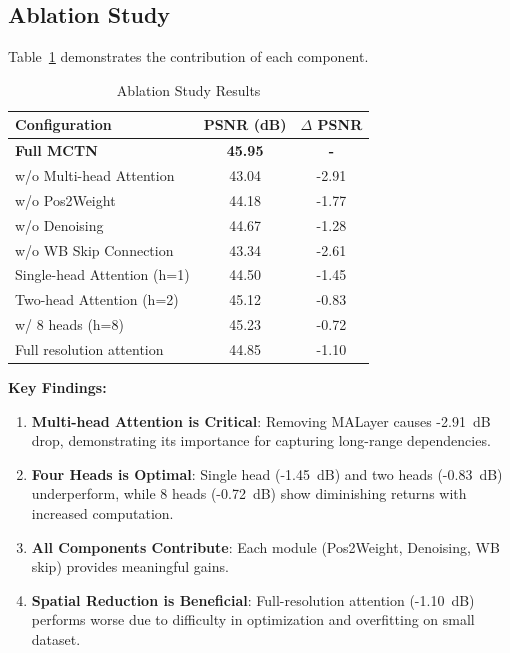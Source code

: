 \documentclass[conference]{IEEEtran}
\begin{document}
\subsection{Ablation Study}

Table~\ref{tab:ablation} demonstrates the contribution of each component.

\begin{table}[h]
\centering
\caption{Ablation Study Results}
\label{tab:ablation}
\begin{tabular}{lcc}
\toprule
\textbf{Configuration} & \textbf{PSNR (dB)} & \textbf{$\Delta$ PSNR} \\
\midrule
\textbf{Full MCTN} & \textbf{45.95} & \textbf{-} \\
\midrule
w/o Multi-head Attention & 43.04 & -2.91 \\
w/o Pos2Weight & 44.18 & -1.77 \\
w/o Denoising & 44.67 & -1.28 \\
w/o WB Skip Connection & 43.34 & -2.61 \\
Single-head Attention (h=1) & 44.50 & -1.45 \\
Two-head Attention (h=2) & 45.12 & -0.83 \\
\midrule
w/ 8 heads (h=8) & 45.23 & -0.72 \\
Full resolution attention & 44.85 & -1.10 \\
\bottomrule
\end{tabular}
\end{table}

\textbf{Key Findings:}

\begin{enumerate}
    \item \textbf{Multi-head Attention is Critical}: Removing MALayer causes -2.91~dB drop, demonstrating its importance for capturing long-range dependencies.
    
    \item \textbf{Four Heads is Optimal}: Single head (-1.45~dB) and two heads (-0.83~dB) underperform, while 8 heads (-0.72~dB) show diminishing returns with increased computation.
    
    \item \textbf{All Components Contribute}: Each module (Pos2Weight, Denoising, WB skip) provides meaningful gains.
    
    \item \textbf{Spatial Reduction is Beneficial}: Full-resolution attention (-1.10~dB) performs worse due to difficulty in optimization and overfitting on small dataset.
\end{enumerate}
\end{document}
